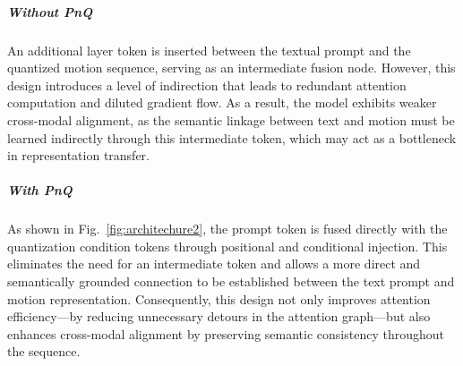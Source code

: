 \documentclass[a4paper,12pt]{article}
\begin{document}
\subparagraph{Without PnQ} An additional layer token is inserted between the textual prompt and the quantized motion sequence, serving as an intermediate fusion node. However, this design introduces a level of indirection that leads to redundant attention computation and diluted gradient flow. As a result, the model exhibits weaker cross-modal alignment, as the semantic linkage between text and motion must be learned indirectly through this intermediate token, which may act as a bottleneck in representation transfer.

\subparagraph{With PnQ} 
As shown in Fig.~\ref{fig:architechure2}, the prompt token is fused directly with the quantization condition tokens through positional and conditional injection. This eliminates the need for an intermediate token and allows a more direct and semantically grounded connection to be established between the text prompt and motion representation. Consequently, this design not only improves attention efficiency—by reducing unnecessary detours in the attention graph—but also enhances cross-modal alignment by preserving semantic consistency throughout the sequence.
\end{document}
